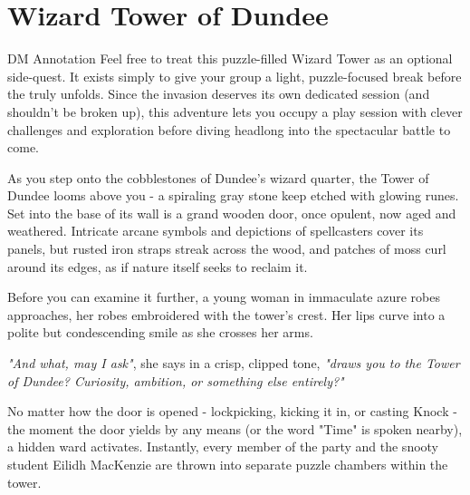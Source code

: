 \chapter*{Wizard Tower of Dundee}
\begingroup
	\DndSetThemeColor[PhbTan]
	\begin{DndComment}{DM Annotation}
		Feel free to treat this puzzle-filled Wizard Tower as an optional side-quest. It exists simply to give your group a light, puzzle-focused break before the \hyperref[chapter:UnicornInvasionOfDundee]{} truly unfolds. Since the invasion deserves its own dedicated session (and shouldn't be broken up), this adventure lets you occupy a play session with clever challenges and exploration before diving headlong into the spectacular battle to come.
	\end{DndComment}
\endgroup
{}

\begin{DndReadAloud}
	As you step onto the cobblestones of Dundee's wizard quarter, the Tower of Dundee looms above you - a spiraling gray stone keep etched with glowing runes. Set into the base of its wall is a grand wooden door, once opulent, now aged and weathered. Intricate arcane symbols and depictions of spellcasters cover its panels, but rusted iron straps streak across the wood, and patches of moss curl around its edges, as if nature itself seeks to reclaim it.

	Before you can examine it further, a young woman in immaculate azure robes approaches, her robes embroidered with the tower's crest. Her lips curve into a polite but condescending smile as she crosses her arms.

	\textit{"And what, may I ask"}, she says in a crisp, clipped tone, \textit{"draws you to the Tower of Dundee? Curiosity, ambition, or something else entirely?"}
\end{DndReadAloud}

{\noindent\entryfont No matter how the door is opened - lockpicking, kicking it in, or casting Knock - the moment the door yields by any means (or the word "Time" is spoken nearby), a hidden ward activates. Instantly, every member of the party and the snooty student Eilidh MacKenzie are thrown into separate puzzle chambers within the tower.}

